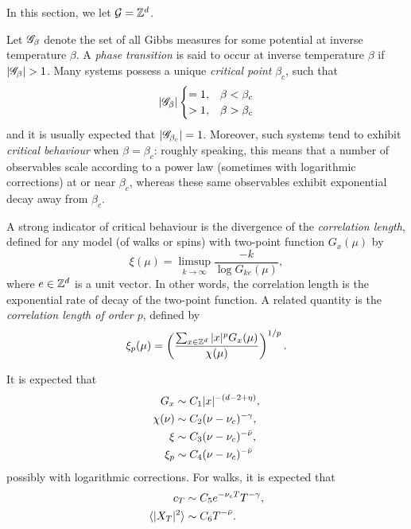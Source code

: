 
In this section, we let $\mathcal{G} = { {{\mathbb Z}}^d }$.

Let $\mathscr{G}_\beta$ denote the set of all Gibbs measures for some potential at inverse temperature
$\beta$. A \emph{phase transition} is said to occur at inverse temperature $\beta$ if
$|\mathscr{G}_\beta| > 1$. Many systems possess a unique \emph{critical point} $\beta_c$, such that
\begin{equation}
|\mathscr{G}_\beta|
\begin{cases}
=1,  & \beta < \beta_c \\
> 1, & \beta > \beta_c
\end{cases}
\end{equation}
and it is usually expected that $|\mathscr{G}_{\beta_c}| = 1$.
Moreover, such systems tend to exhibit \emph{critical behaviour} when $\beta = \beta_c$:
roughly speaking, this means that a number of observables scale according to a power
law (sometimes with logarithmic corrections) at or near $\beta_c$, whereas these same
observables exhibit exponential decay away from $\beta_c$.

A strong indicator of critical behaviour is the divergence of the
\emph{correlation length}, defined for any model (of walks or spins) with two-point
function $G_x(\mu)$ by
\begin{equation}
\xi(\mu) = \limsup_{k\to\infty} \frac{-k}{\log G_{ke}(\mu)},
\end{equation}
where $e \in { {{\mathbb Z}}^d }$ is a unit vector.
In other words, the correlation length is the exponential rate of decay of the
two-point function.
A related quantity is the \emph{correlation length of order $p$}, defined by
\begin{equation}
\xi_p(\mu) = \left(\frac{\sum_{x\in{ {{\mathbb Z}}^d }} |x|^p G_x(\mu)}{\chi(\mu)}\right)^{1/p}.
\end{equation}

It is expected that
\begin{align}
G_x       &\sim C_1 |x|^{-(d - 2 + \eta)}, \\
\chi(\nu) &\sim C_2 (\nu - \nu_c)^{-\gamma}, \\
\xi       &\sim C_3 (\nu - \nu_c)^{-\bar\nu}, \\
\xi_p     &\sim C_4 (\nu - \nu_c)^{-\bar\nu}
\end{align}
possibly with logarithmic corrections.
For walks, it is expected that
\begin{align}
c_T                       &\sim C_5 e^{-\nu_c T} T^{-\gamma}, \\
\langle |X_T|^2 \rangle   &\sim C_6 T^{-\bar\nu}.
\end{align}

